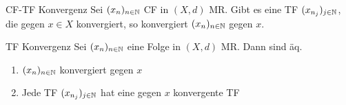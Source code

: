 \begin{satz}{CF-TF Konvergenz}
  Sei \((x_n)_{n\in \mathbb{N}}\) CF in \((X,d)\) MR. Gibt es eine TF
  \((x_{n_j})_{{j\in \mathbb{N}}}\), die gegen \(x\in X\) konvergiert,
  so konvergiert \((x_n)_{n\in \mathbb{N}}\) gegen \(x\).
\end{satz}

\begin{satz}{TF Konvergenz}
  Sei \((x_n)_{n\in \mathbb{N}}\) eine Folge in \((X,d)\) MR. Dann sind
  äq.
  \begin{enumerate}[label=(\roman*)]
    \item \((x_n)_{n\in \mathbb{N}}\) konvergiert gegen \(x\)
    \item Jede TF \((x_{n_j})_{j\in \mathbb{N}}\) hat eine gegen \(x\)
      konvergente TF
  \end{enumerate}
\end{satz}